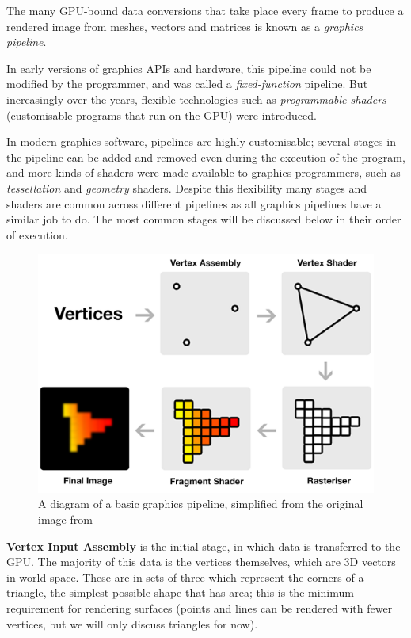\documentclass[11pt, a4paper, twocolumn]{article}
\begin{document}
The many GPU-bound data conversions that take place every frame to produce a rendered image from meshes, vectors and matrices is known as a \emph{graphics pipeline}.

In early versions of graphics APIs and hardware, this pipeline could not be modified by the programmer, and was called a \emph{fixed-function} pipeline. But increasingly over the years, flexible technologies such as \emph{programmable shaders} (customisable programs that run on the GPU) were introduced.

In modern graphics software, pipelines are highly customisable; several stages in the pipeline can be added and removed even during the execution of the program, and more kinds of shaders were made available to graphics programmers, such as \emph{tessellation} and \emph{geometry} shaders. Despite this flexibility many stages and shaders are common across different pipelines as all graphics pipelines have a similar job to do. The most common stages will be discussed below in their order of execution.

\begin{figure}[h]
\includegraphics[width=\linewidth]{pipeline}
\caption{A diagram of a basic graphics pipeline, simplified from the original image from \citet{PipelineImage}}
\label{fig:pipeline}
\end{figure}

\textbf{Vertex Input Assembly} is the initial stage, in which data is transferred to the GPU. The majority of this data is the vertices themselves, which are 3D vectors in world-space. These are in sets of three which represent the corners of a triangle, the simplest possible shape that has area; this is the minimum requirement for rendering surfaces (points and lines can be rendered with fewer vertices, but we will only discuss triangles for now).
\end{document}
